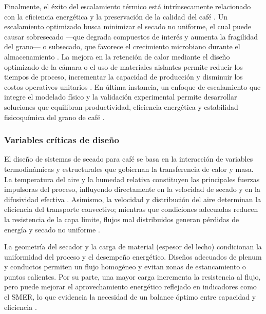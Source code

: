 Finalmente, el éxito del escalamiento térmico está intrínsecamente relacionado con la eficiencia energética y la preservación de la calidad del café \parencite{cruz-ospina_improving_2026, szpicer_advances_2025}. Un escalamiento optimizado busca minimizar el secado no uniforme, el cual puede causar sobresecado —que degrada compuestos de interés y aumenta la fragilidad del grano— o subsecado, que favorece el crecimiento microbiano durante el almacenamiento \parencite{yu_current_2025}. La mejora en la retención de calor mediante el diseño optimizado de la cámara o el uso de materiales aislantes permite reducir los tiempos de proceso, incrementar la capacidad de producción y disminuir los costos operativos unitarios \parencite{cruz-ospina_improving_2026}. En última instancia, un enfoque de escalamiento que integre el modelado físico y la validación experimental permite desarrollar soluciones que equilibran productividad, eficiencia energética y estabilidad fisicoquímica del grano de café \parencite{du_design_2025, yu_current_2025}.

\subsubsection{Variables críticas de diseño}

El diseño de sistemas de secado para café se basa en la interacción de variables termodinámicas y estructurales que gobiernan la transferencia de calor y masa. La temperatura del aire y la humedad relativa constituyen las principales fuerzas impulsoras del proceso, influyendo directamente en la velocidad de secado y en la difusividad efectiva \parencite{geng_thermodynamically_2023, yu_current_2025}. Asimismo, la velocidad y distribución del aire determinan la eficiencia del transporte convectivo; mientras que condiciones adecuadas reducen la resistencia de la capa límite, flujos mal distribuidos generan pérdidas de energía y secado no uniforme \parencite{cruz-ospina_improving_2026, liu_optimization_2025}.

La geometría del secador y la carga de material (espesor del lecho) condicionan la uniformidad del proceso y el desempeño energético. Diseños adecuados de plenum y conductos permiten un flujo homogéneo y evitan zonas de estancamiento o puntos calientes. Por su parte, una mayor carga incrementa la resistencia al flujo, pero puede mejorar el aprovechamiento energético reflejado en indicadores como el SMER, lo que evidencia la necesidad de un balance óptimo entre capacidad y eficiencia \parencite{du_design_2025, cansee_effect_2026}.

